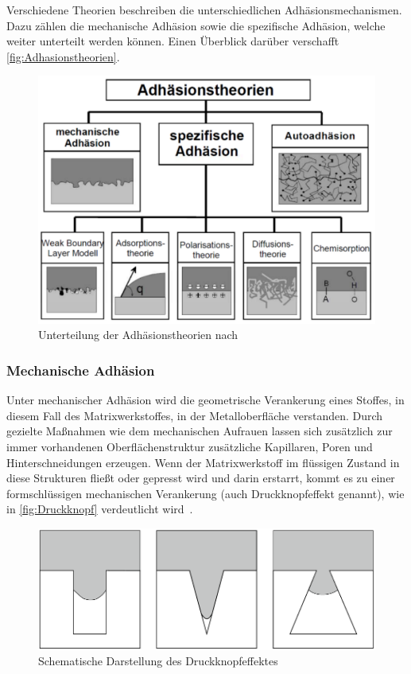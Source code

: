 Verschiedene Theorien beschreiben die unterschiedlichen Adhäsionsmechanismen.
Dazu zählen die mechanische Adhäsion sowie die spezifische Adhäsion, welche weiter unterteilt werden können.
Einen Überblick darüber verschafft \autoref{fig:Adhasionstheorien}.

\begin{figure}[H]%
    \centering
    \includegraphics[width=0.6\linewidth]{Bilder/SdT/Adhasionstheorien}
    \caption[Unterteilung der Adhäsionstheorien]{Unterteilung der Adhäsionstheorien nach~\cite{Garbassi1998}}
    \label{fig:Adhasionstheorien}
\end{figure}

\subsubsection{Mechanische Adhäsion}

Unter mechanischer Adhäsion wird die geometrische Verankerung eines Stoffes, in diesem Fall des Matrixwerkstoffes, in der Metalloberfläche verstanden.
Durch gezielte Maßnahmen wie dem mechanischen Aufrauen lassen sich zusätzlich zur immer vorhandenen Oberflächenstruktur zusätzliche Kapillaren, Poren und Hinterschneidungen erzeugen.
Wenn der Matrixwerkstoff im flüssigen Zustand in diese Strukturen fließt oder gepresst wird und darin erstarrt, kommt es zu einer formschlüssigen mechanischen Verankerung (auch Druckknopfeffekt genannt), wie in \autoref{fig:Druckknopf} verdeutlicht wird~\cite{Habenicht2009,Mittal1999}.


\begin{figure}[H]%
    \centering
    \includegraphics[width=0.6\linewidth]{Bilder/SdT/Druckknopfeffekt}
    \caption[Druckknopfeffekt]{Schematische Darstellung des Druckknopfeffektes~\cite{Mittal1999}}
    \label{fig:Druckknopf}
\end{figure}



